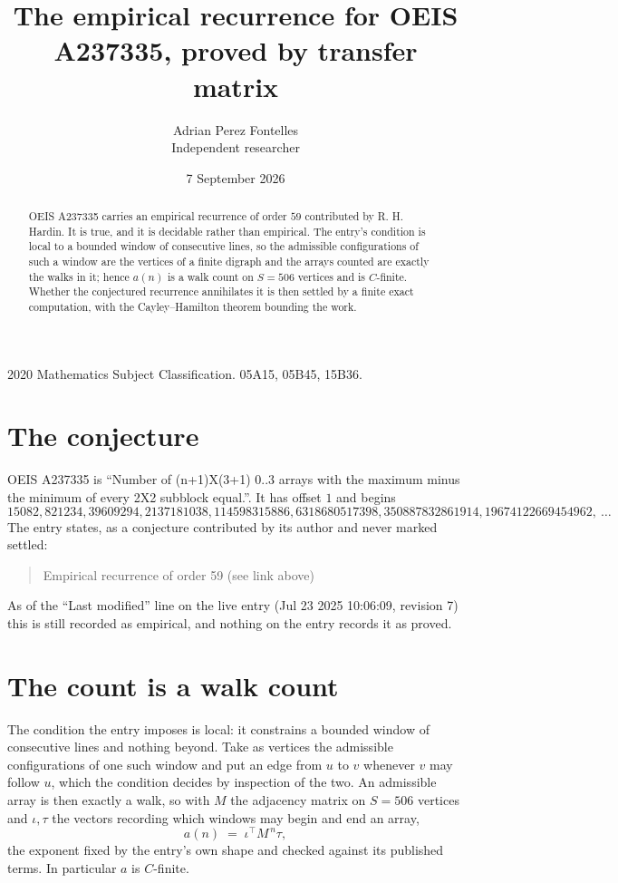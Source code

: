 \documentclass[11pt,a4paper]{article}
\title{The empirical recurrence for OEIS A237335, proved by transfer matrix}
\author{Adrian Perez Fontelles\\ \small Independent researcher}
\date{7 September 2026}
\theoremstyle{plain}
\theoremstyle{definition}
\begin{document}
\maketitle

\begin{abstract}
OEIS A237335 carries an empirical recurrence of order $59$ contributed by R. H. Hardin. It is
true, and it is decidable rather than empirical. The entry's condition is local to a bounded window of consecutive lines, so
the admissible configurations of such a window are the vertices of a finite digraph and the
arrays counted are exactly the walks in it; hence $a(n)$ is a walk count on $S=506$ vertices
and is $C$-finite. Whether the conjectured recurrence annihilates it is then settled by a
finite exact computation, with the Cayley--Hamilton theorem bounding the work.
\end{abstract}

\noindent\small 2020 Mathematics Subject Classification. 05A15, 05B45, 15B36.\normalsize

\section{The conjecture}

OEIS A237335 is ``Number of (n+1)X(3+1) 0..3 arrays with the maximum minus the minimum of every 2X2 subblock equal.''. It has offset $1$ and begins
\[
15082, 821234, 39609294, 2137181038, 114598315886, 6318680517398, 350887832861914, 19674122669454962,\ \dots
\]
The entry states, as a conjecture contributed by its author and never marked settled:
\begin{quote}
Empirical recurrence of order 59 (see link above)
\end{quote}
As of the ``Last modified'' line on the live entry (Jul 23 2025 10:06:09, revision 7) this is still
recorded as empirical, and nothing on the entry records it as proved.

\section{The count is a walk count}

The condition the entry imposes is local: it constrains a bounded window of consecutive lines and nothing beyond. Take as
vertices the admissible configurations of one such window and put an edge from $u$ to $v$
whenever $v$ may follow $u$, which the condition decides by inspection of the two. An
admissible array is then exactly a walk, so with $M$ the adjacency matrix on $S=506$ vertices
and $\iota,\tau$ the vectors recording which windows may begin and end an array,
\[
a(n)\;=\;\iota^{\!\top}M^{\,n}\tau ,
\]
the exponent fixed by the entry's own shape and checked against its published terms. In
particular $a$ is $C$-finite.
\end{document}
